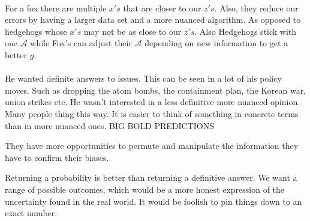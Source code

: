 \documentclass[12pt]{article}
\begin{document}


\begin{enumerate}

 \\
For a fox there are multiple $x's$ that are closer to our $z's$. Also, they reduce our errors by having a larger data set and a more nuanced algorithm. As opposed to hedgehogs whose $x's$ may not be as close to our $z's$. Also Hedgehogs stick with one $\mathcal{A}$ while Fox's can adjust their $\mathcal{A}$ depending on new information to get a better $g$.\\

\\

He wanted definite answers to issues. This can be seen in a lot of his policy moves. Such as dropping the atom bombs, the containment plan, the Korean war, union strikes etc. He wasn't interested in a less definitive more nuanced opinion. \\
Many people thing this way. It is easier to think of something in concrete terms than in more nuanced ones. BIG BOLD PREDICTIONS\\


They have more opportunities to permute and manipulate the information they have to confirm their biases.\\


Returning a probability is better than returning a definitive answer. We want a range of possible outcomes, which would be a more honest expression of the uncertainty found in the real world. It would be foolish to pin things down to an exact number.\\
\end{enumerate}
\end{document}
